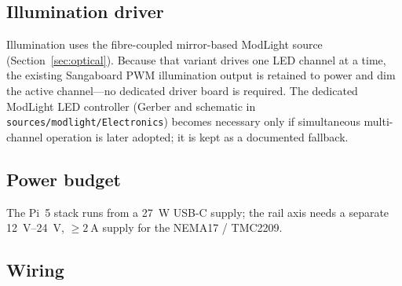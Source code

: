 \subsection{Illumination driver}
Illumination uses the fibre-coupled mirror-based ModLight source
(Section~\ref{sec:optical}). Because that variant drives one LED channel at a
time, the existing Sangaboard PWM illumination output is retained to power and
dim the active channel---no dedicated driver board is required. The dedicated
ModLight LED controller (Gerber and schematic in
\texttt{sources/modlight/Electronics}) becomes necessary only if simultaneous
multi-channel operation is later adopted; it is kept as a documented fallback.

\subsection{Power budget}
The Pi~5 stack runs from a \SI{27}{\watt} USB-C supply; the rail axis needs a
separate \SIrange{12}{24}{\volt}, $\geq\SI{2}{\ampere}$ supply for the NEMA17 /
TMC2209. 

\subsection{Wiring}
